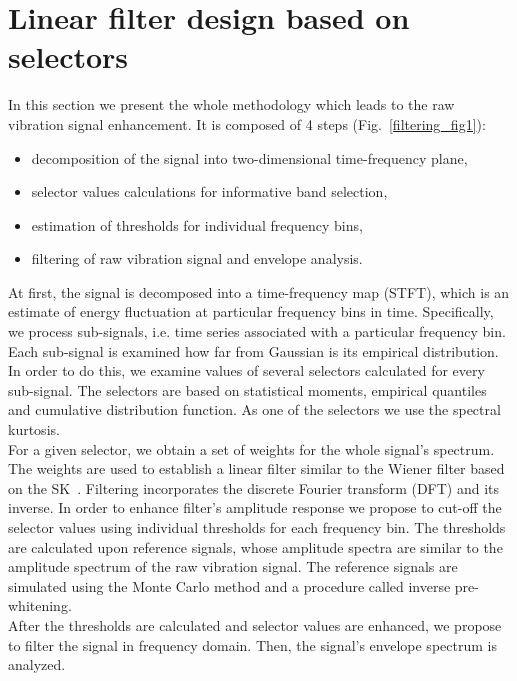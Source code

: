 \section{Linear filter design based on selectors}\label{methodology_filtering}

In this section we present the whole methodology which leads to the raw vibration signal enhancement. It is composed of 4 steps (Fig.~\ref{filtering_fig1}):
\begin{itemize}
\item{decomposition of the signal into two-dimensional time-frequency plane,}
\item{selector values calculations for informative band selection,}
\item{estimation of thresholds for individual frequency bins,}
\item{filtering of raw vibration signal and envelope analysis.}
\end{itemize}
At first, the signal is decomposed into a time-frequency map (STFT), which is an estimate of energy fluctuation at particular frequency bins in time. Specifically, we process sub-signals, i.e. time series associated with a particular frequency bin. Each sub-signal is examined how far from Gaussian is its empirical distribution. In order to do this, we examine values of several selectors calculated for every sub-signal. The selectors are based on statistical moments, empirical quantiles and cumulative distribution function. As one of the selectors we use the spectral kurtosis.\\
For a given selector, we obtain a set of weights for the whole signal's spectrum. The weights are used to establish a linear filter similar to the Wiener filter based on the SK~\cite{Combet2009652}. Filtering incorporates the discrete Fourier transform (DFT) and its inverse. In order to enhance filter's amplitude response we propose to cut-off the selector values using individual thresholds for each frequency bin. The thresholds are calculated upon reference signals, whose amplitude spectra are similar to the amplitude spectrum of the raw vibration signal. The reference signals are simulated using the Monte Carlo method and a procedure called inverse pre-whitening.\\
After the thresholds are calculated and selector values are enhanced, we propose to filter the signal in frequency domain. Then, the signal's envelope spectrum is analyzed.

